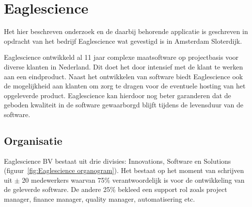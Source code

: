 \chapter{Eaglescience}\label{ch:eaglescience} %

\label{ch:Eaglescience} %


Het hier beschreven onderzoek en de daarbij behorende applicatie is geschreven in opdracht van het bedrijf Eaglescience wat gevestigd is in Amsterdam Sloterdijk.

Eaglescience ontwikkeld al 11 jaar complexe maatsoftware op projectbasis voor diverse klanten in Nederland. Dit doet het door intensief met de klant te werken aan een eindproduct.
Naast het ontwikkelen van software biedt Eaglescience ook de mogelijkheid aan klanten om zorg te dragen voor de eventuele hosting van het opgeleverde product.
Eaglescience kan hierdoor nog beter garanderen dat de geboden kwaliteit in de software gewaarborgd blijft tijdens de levensduur van de software.

\section{Organisatie}\label{sec:organisatie}

Eaglescience BV bestaat uit drie divisies: Innovations, Software en Solutions (figuur~\ref{fig:Eaglescience organogram}).%
Het bestaat op het moment van schrijven uit $\pm$ 20 medewerkers waarvan 75\% verantwoordelijk is voor de ontwikkeling van de geleverde software.
De andere 25\% bekleed een support rol zoals project manager, finance manager, quality manager, automatisering etc.

